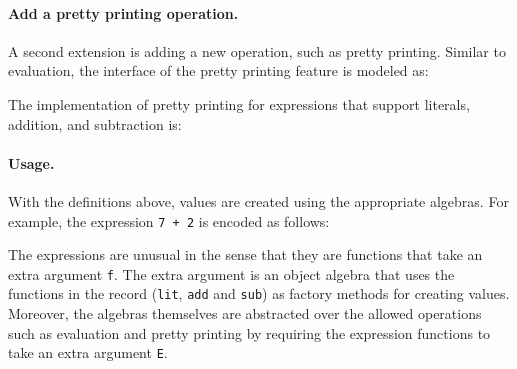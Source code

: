 \paragraph{Add a pretty printing operation.}
A second extension is adding a new operation, such as pretty printing. 
Similar to evaluation, the interface of the pretty printing feature
is modeled as:
\begin{comment}
  \begin{lstlisting}{language=F2J}
    type IPrint = {print : String};
  \end{lstlisting}
\end{comment}
The implementation of pretty printing for expressions that support literals,
addition, and subtraction is:
\begin{comment}
  \begin{lstlisting}{language=F2J}
    let printAlg : SubExpAlg[IPrint] = {
      lit = \(x: Int) -> {print = x.toString()},
      add = \(x: IPrint) (y: IPrint) -> {
        print = x.print ++ " + " ++ y.print
      },
      sub = \(x: IPrint) (y: IPrint) -> {
        print = x.print ++ " - " ++ y.print
      }
    };
  \end{lstlisting}
\end{comment}

\paragraph{Usage.}
With the definitions above, values are created using the
appropriate algebras. For example, the expression \lstinline{7 + 2} 
is encoded as follows:
\begin{comment}
  \begin{lstlisting}{language=F2J}
    let e1[E] (f: SubExpAlg[E]) = 
    f.add (f.lit 7) (f.lit 2);
  \end{lstlisting}
\end{comment}

\noindent The expressions are unusual in the sense that they are
functions that take an extra argument \lstinline$f$. The extra
argument is an object algebra that uses the functions in the record
(\lstinline$lit$, \lstinline$add$ and \lstinline$sub$) as factory
methods for creating values. Moreover, the algebras themselves are
abstracted over the allowed operations such as evaluation and pretty
printing by requiring the expression functions to take an extra
argument \lstinline$E$.

